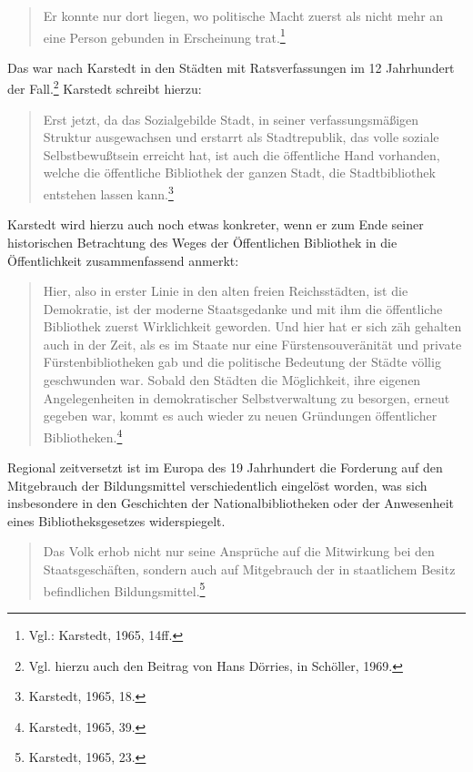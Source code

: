 \documentclass[a4paper,
fontsize=11pt,
oneside,
numbers=noperiodatend,
parskip=half-,
bibliography=totoc,
final
]{scrartcl}
\begin{document}
\begin{quote}
Er konnte nur dort liegen, wo politische Macht zuerst als nicht mehr an
eine Person gebunden in Erscheinung trat.\footnote{Vgl.: Karstedt, 1965,
  14ff.}
\end{quote}

Das war nach Karstedt in den Städten mit Ratsverfassungen im 12
Jahrhundert der Fall.\footnote{Vgl. hierzu auch den Beitrag von Hans
  Dörries, in Schöller, 1969.} Karstedt schreibt hierzu:

\begin{quote}
Erst jetzt, da das Sozialgebilde Stadt, in seiner verfassungsmäßigen
Struktur ausgewachsen und erstarrt als Stadtrepublik, das volle soziale
Selbstbewußtsein erreicht hat, ist auch die öffentliche Hand vorhanden,
welche die öffentliche Bibliothek der ganzen Stadt, die Stadtbibliothek
entstehen lassen kann.\footnote{Karstedt, 1965, 18.}
\end{quote}

Karstedt wird hierzu auch noch etwas konkreter, wenn er zum Ende seiner
historischen Betrachtung des Weges der Öffentlichen Bibliothek in die
Öffentlichkeit zusammenfassend anmerkt:

\begin{quote}
Hier, also in erster Linie in den alten freien Reichsstädten, ist die
Demokratie, ist der moderne Staatsgedanke und mit ihm die öffentliche
Bibliothek zuerst Wirklichkeit geworden. Und hier hat er sich zäh
gehalten auch in der Zeit, als es im Staate nur eine Fürstensouveränität
und private Fürstenbibliotheken gab und die politische Bedeutung der
Städte völlig geschwunden war. Sobald den Städten die Möglichkeit, ihre
eigenen Angelegenheiten in demokratischer Selbstverwaltung zu besorgen,
erneut gegeben war, kommt es auch wieder zu neuen Gründungen
öffentlicher Bibliotheken.\footnote{Karstedt, 1965, 39.}
\end{quote}

Regional zeitversetzt ist im Europa des 19 Jahrhundert die Forderung auf
den Mitgebrauch der Bildungsmittel verschiedentlich eingelöst worden,
was sich insbesondere in den Geschichten der Nationalbibliotheken oder
der Anwesenheit eines Bibliotheksgesetzes widerspiegelt.

\begin{quote}
Das Volk erhob nicht nur seine Ansprüche auf die Mitwirkung bei den
Staatsgeschäften, sondern auch auf Mitgebrauch der in staatlichem Besitz
befindlichen Bildungsmittel.\footnote{Karstedt, 1965, 23.}
\end{quote}
\end{document}

